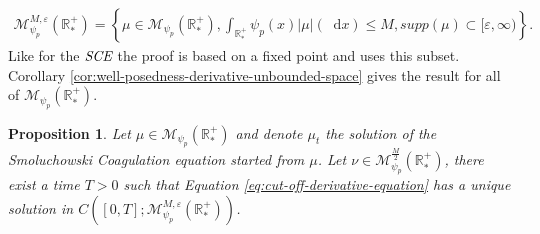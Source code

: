 \documentclass[11pt,a4paper]{article}
\newcommand{\RRP}{\mathbb{R}^+_*}
\newcommand{\MC}{\mathcal{M}}
\newcommand{\SCE}{\emph{SCE}}
\newcommand{\dd}{\mathop{}\!\mathrm{d}}
\newtheorem{proposition}[theorem]{Proposition}
\begin{document}
\begin{align*}
    \MC^{M,\varepsilon}_{\psi_p}\left(\RRP\right) = \left\lbrace \mu \in \MC_{\psi_p}\left(\RRP\right), \int_{\RRP} \psi_p(x)|\mu|(\dd x) \leq M, supp(\mu) \subset [\varepsilon,\infty) \right\rbrace.
\end{align*}
Like for the $\SCE$ the proof is based on a fixed point and uses this subset. Corollary \ref{cor:well-posedness-derivative-unbounded-space} gives the result for all of $\MC_{\psi_p}\left(\RRP\right)$.
\begin{proposition}\label{prop:well-posedness-derivative-cutoff-bounded}
    Let $\mu \in \MC_{\psi_p}\left(\RRP\right) $ and denote $\mu_t$ the solution of the Smoluchowski Coagulation equation started from $\mu$. Let $\nu \in \MC^{\frac{M}{2}}_{\psi_p}\left(\RRP\right)$, there exist a time $T> 0$ such that Equation \eqref{eq:cut-off-derivative-equation} has a unique solution in $C\left([0,T];\MC^{M,\varepsilon}_{\psi_p}\left(\RRP\right) \right)$.
\end{proposition}
\end{document}
